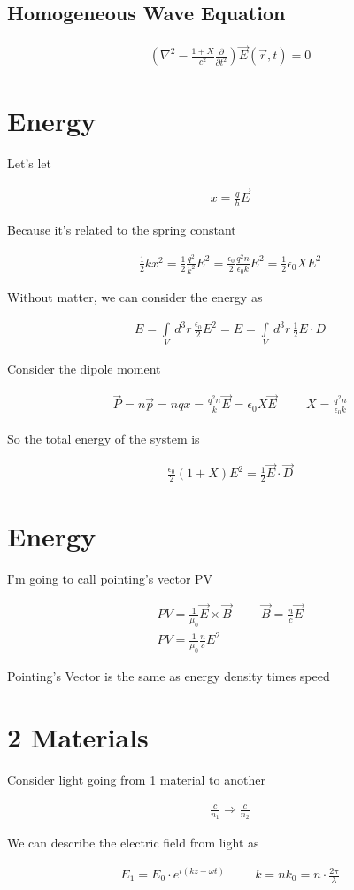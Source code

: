 \documentclass[fleqn]{report}
\newcommand{\hp}{\hspace{1cm}}
\newcommand{\del}{\partial}
\newcommand{\equations} [1] {
\begin{gather*}
#1
\end{gather*}
}
\begin{document}
\subsection{Homogeneous Wave Equation}
\equations{
    \left(
        \nabla^2 
        -
        \frac{1 + X}{c^2}
        \frac{\del}{\del t^2}
    \right)
    \vec E(\vec r, t)
    =
    0
}

\section{Energy}
Let's let
\equations{
    x = \frac{q}{h} \vec E 
}
Because it's related to the spring constant 

\equations{
    \frac{1}{2} k x^2
    =
    \frac{1}{2}
    \frac{q^2}{k^2} E^2 
    =
    \frac{\epsilon_0}{2}
    \frac{q^2 n}{\epsilon_0 k} E^2 
    =
    \frac{1}{2} \epsilon_0 X E^2
}

Without matter, we can consider the energy as 
\equations{
    E = \int\limits_V \, d^3 r \, 
    \frac{\epsilon_0}{2} E^2
    =
    E = \int\limits_V \, d^3 r \, 
    \frac{1}{2} E \cdot D
}

Consider the dipole moment 
\equations{
    \vec P 
    =
    n \vec p
    =
    n q x 
    =
    \frac{q^2 n}{k} \vec E 
    =
    \epsilon_0 X \vec E 
    \hp 
    X 
    =
    \frac{q^2 n}{\epsilon_0 k}
}

So the total energy of the system is 
\equations{
    \frac{\epsilon_0}{2}
    (1 + X)
    E^2 
    =
    \frac{1}{2}
    \vec E \cdot \vec D 
}

\section{Energy}
I'm going to call pointing's vector PV 
\equations{
    PV = \frac{1}{\mu_0} \vec E \times \vec B 
    \hp 
    \vec B = \frac{n}{c} \vec E
    \\
    PV 
    =
    \frac{1}{\mu_0}
    \frac{n}{c} E^2
}

Pointing's Vector is the same as energy density times speed 

\section{2 Materials}
Consider light going from 1 material to another 
\equations{
    \frac{c}{n_1}
    \Rightarrow 
    \frac{c}{n_2}
}

We can describe the electric field from light as 
\equations{
    E_1 = E_0 \cdot e^{i(kz - \omega t)}
    \hp 
    k 
    =
    n k_0 
    =
    n \cdot \frac{2 \pi}{\lambda}
}
\end{document}
